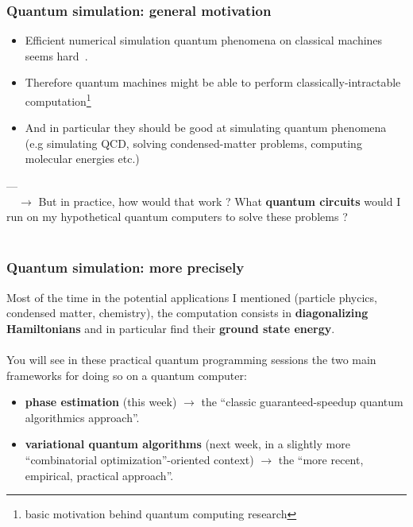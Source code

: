 \documentclass{beamer}
\begin{document}
\begin{frame}
\frametitle{Quantum simulation: general motivation}

\begin{itemize}
\item Efficient numerical simulation quantum phenomena on classical machines seems hard~\textcolor{blue}{\cite{feynman1982simulating}}.
\item Therefore quantum machines might be able to perform classically-intractable computation\footnote{basic motivation behind quantum computing research}
\item And in particular they should be good at simulating quantum phenomena (e.g simulating QCD, solving condensed-matter problems, computing molecular energies etc.) 
\end{itemize}
---\\
$\quad\rightarrow$ But in practice, how would that work ? What \textbf{quantum circuits} would I run on my hypothetical
quantum computers to solve these problems ?\\~\\

\end{frame}

\begin{frame}
\frametitle{Quantum simulation: more precisely}

Most of the time in the potential applications I mentioned (particle phycics, condensed matter, chemistry),
the computation consists in \textbf{diagonalizing Hamiltonians} and in particular find their \textbf{ground
state energy}.\\~\\
You will see in these practical quantum programming sessions the two main frameworks for doing so on a quantum computer:
\begin{itemize}
\item \textbf{phase estimation} (this week) $\rightarrow$ the ``classic guaranteed-speedup quantum algorithmics approach''.
\item \textbf{variational quantum algorithms} \textcolor{blue}{\cite{cerezo2020variational}} (next week, in a slightly more ``combinatorial optimization''-oriented context) $\rightarrow$ the ``more recent, empirical, practical approach''. 
\end{itemize}

\end{frame}
\end{document}
